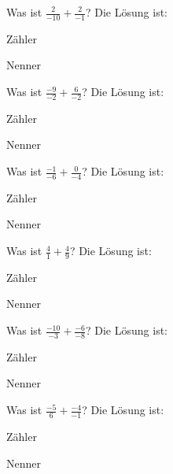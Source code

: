 \documentclass{ximera}
\begin{document}
\begin{shuffle}
\begin{question}
Was ist $\frac{2}{-10} + \frac{2}{-1}$?
Die Lösung ist:
\begin{solution}
Zähler 
\end{solution}
\begin{solution}
Nenner 
\end{solution}
\end{question}


\begin{question}
Was ist $\frac{-9}{-2} + \frac{6}{-2}$?
Die Lösung ist:
\begin{solution}
Zähler 
\end{solution}
\begin{solution}
Nenner 
\end{solution}
\end{question}


\begin{question}
Was ist $\frac{-1}{-6} + \frac{0}{-4}$?
Die Lösung ist:
\begin{solution}
Zähler 
\end{solution}
\begin{solution}
Nenner 
\end{solution}
\end{question}


\begin{question}
Was ist $\frac{4}{1} + \frac{4}{9}$?
Die Lösung ist:
\begin{solution}
Zähler 
\end{solution}
\begin{solution}
Nenner 
\end{solution}
\end{question}


\begin{question}
Was ist $\frac{-10}{-3} + \frac{-6}{-8}$?
Die Lösung ist:
\begin{solution}
Zähler 
\end{solution}
\begin{solution}
Nenner 
\end{solution}
\end{question}


\begin{question}
Was ist $\frac{-5}{6} + \frac{-4}{-1}$?
Die Lösung ist:
\begin{solution}
Zähler 
\end{solution}
\begin{solution}
Nenner 
\end{solution}
\end{question}



\end{shuffle}
\end{document}
